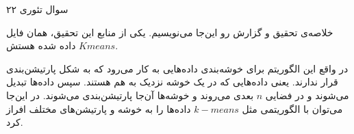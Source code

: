 سوال تئوری ۲۲

خلاصه‌ی تحقیق و گزارش رو این‌جا می‌نویسیم. یکی از منابع این تحقیق، همان فایل
$Kmeans$
داده شده هستش.

در واقع این الگوریتم برای خوشه‌بندی داده‌هایی به کار می‌رود که به شکل پارتیشن‌بندی قرار ندارند. یعنی داده‌هایی که در یک خوشه نزدیک به هم هستند. سپس داده‌ها تبدیل می‌شوند و در فضایی
$n$
بعدی می‌روند و خوشه‌ها آن‌جا پارتیشن‌بندی می‌شوند.
در این‌جا می‌توان با الگوریتمی مثل
$k-means$
داده‌ها را به خوشه و پارتیشن‌های مختلف افراز کرد.